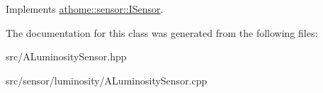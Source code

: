 Implements \mbox{\hyperlink{classathome_1_1sensor_1_1_i_sensor_af86df8538fecfcfc670b4adfbbde6abb}{athome\+::sensor\+::\+I\+Sensor}}.



The documentation for this class was generated from the following files\+:\begin{DoxyCompactItemize}
\item 
src/A\+Luminosity\+Sensor.\+hpp\item 
src/sensor/luminosity/A\+Luminosity\+Sensor.\+cpp\end{DoxyCompactItemize}
